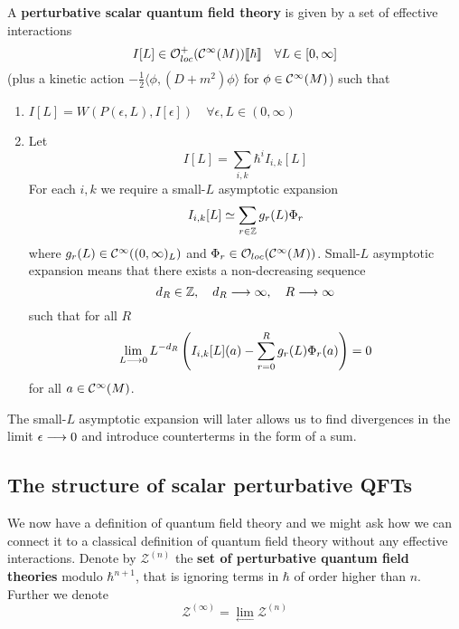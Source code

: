 \begin{definition}
\label{def:PSQFTs}
  A \textbf{perturbative scalar quantum field theory} is given by a set of effective interactions
  \begin{equation}I[L] \in \mathcal{O}^+_{loc}(\mathcal{C}^{\infty}(M))\llbracket \hbar \rrbracket \quad \forall L \in [0, \infty]\end{equation}
  (plus a kinetic action $- \frac{1}{2} \langle \phi, (D + m^2) \phi \rangle$ for $\phi \in \Ci(M)$) such that
  \begin{enumerate}
    \item $I[L] = W(P(\epsilon, L), I[\epsilon]) \quad \forall \epsilon,L \in (0,\infty)$

    \item Let
    \begin{equation}I[L] = \sum_{i,k} \hbar^i I_{i,k}[L]\end{equation}
    For each $i,k$ we require a small-$L$ asymptotic expansion
    \begin{equation}I_{i,k}[L] \simeq \sum_{r \in \mathbb{Z}} g_r(L) \Phi_r\end{equation}
    where $g_r(L) \in \mathcal{C}^{\infty}((0,\infty)_L)$ and $\Phi_r \in \mathcal{O}_{loc}(\mathcal{C}^{\infty}(M))$. Small-$L$ asymptotic expansion means that there exists a non-decreasing sequence
    \begin{equation}d_R \in \mathbb{Z}, \quad d_R \longrightarrow \infty, \quad R\longrightarrow \infty\end{equation}
    such that for all $R$
    \begin{equation}\lim_{L \longrightarrow 0} L^{-d_R} \left( I_{i,k}[L](a) - \sum_{r=0}^R g_r(L) \Phi_r(a) \right) = 0\end{equation}
    for all $a \in \mathcal{C}^{\infty}(M)$.
  \end{enumerate}
\end{definition}
The small-$L$ asymptotic expansion will later allows us to find divergences in the limit $\epsilon \lra 0$ and introduce counterterms in the form of a sum.

\subsection{The structure of scalar perturbative QFTs}

We now have a definition of quantum field theory and we might ask how we can connect it to a classical definition of quantum field theory without any effective interactions. Denote by $\mathcal{Z}^{(n)}$ the \textbf{set of perturbative quantum field theories} modulo $\hbar^{n+1}$, that is ignoring terms in $\hbar$ of order higher than $n$. Further we denote
\begin{equation}
  \mathcal{Z}^{(\infty)} = \lim_{\longleftarrow} \mathcal{Z}^{(n)}
\end{equation}

